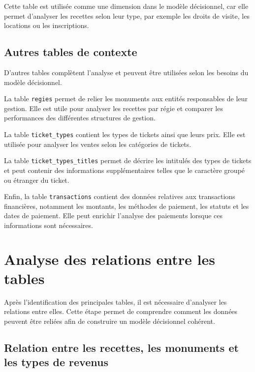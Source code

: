 \documentclass[12pt,a4paper]{report}
\begin{document}
Cette table est utilisée comme une dimension dans le modèle décisionnel, car elle permet d’analyser les recettes selon leur type, par exemple les droits de visite, les locations ou les inscriptions.


\subsection{Autres tables de contexte}

D’autres tables complètent l’analyse et peuvent être utilisées selon les besoins du modèle décisionnel.

La table \texttt{regies} permet de relier les monuments aux entités responsables de leur gestion. Elle est utile pour analyser les recettes par régie et comparer les performances des différentes structures de gestion.

La table \texttt{ticket\_types} contient les types de tickets ainsi que leurs prix. Elle est utilisée pour analyser les ventes selon les catégories de tickets.

La table \texttt{ticket\_types\_titles} permet de décrire les intitulés des types de tickets et peut contenir des informations supplémentaires telles que le caractère groupé ou étranger du ticket.

Enfin, la table \texttt{transactions} contient des données relatives aux transactions financières, notamment les montants, les méthodes de paiement, les statuts et les dates de paiement. Elle peut enrichir l’analyse des paiements lorsque ces informations sont nécessaires.


\section{Analyse des relations entre les tables}

Après l’identification des principales tables, il est nécessaire d’analyser les relations entre elles. Cette étape permet de comprendre comment les données peuvent être reliées afin de construire un modèle décisionnel cohérent.


\subsection{Relation entre les recettes, les monuments et les types de revenus}
\end{document}
